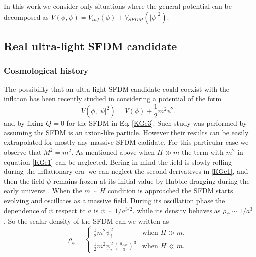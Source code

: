 \documentclass[amssymb,twocolumn,prd,nofootinbib,showpacs]{revtex4-1}
\begin{document}
In this work we consider only situations where the general potential can be 
decomposed as $V(\phi,\psi)=V_{inf}(\phi)+V_{SFDM}(|\psi|^2)$.

\subsection{Real ultra-light SFDM candidate}

\subsubsection{Cosmological history} %
The  possibility  that  an  ultra-light  SFDM  candidate could  coexist  with  the  inflaton  
has  been  recently  studied in \cite{SFrev2} considering a potential of the form
\begin{equation}\label{potential_massive}
V(\phi,|\psi|^2)=V(\phi)+\frac{1}{2}m^2\psi^2.
\end{equation}
%
and by fixing $Q=0$ for the SFDM in Eq. \eqref{KGe3}. Such study was performed by 
assuming the SFDM is an axion-like particle. However their results can be easily extrapolated for mostly any massive SFDM cadidate. 
For this particular case we observe that  $M^2=m^2$. As mentioned above when $H\gg m$ the term with $m^2$ 
in equation \eqref{KGe1} can be neglected. Bering in mind the field is slowly rolling during the inflationary era, 
we can neglect the second derivatives in \eqref{KGe1}, and then the field $\psi$ remains frozen at its initial value by 
Hubble dragging during the early universe \cite{curvatonatractor}. 
%
When the $m\sim H$ condition is approached the SFDM starts evolving and oscillates as a massive field. 
During its oscillation phase the dependence of $\psi$ respect to $a$ is $\psi\sim 1/a^{3/2}$, while its density 
behaves as $\rho_{\psi}\sim 1/a^3$  \cite{SFphi41,SFphi42}. So the scalar density of the SFDM can we written as
\begin{equation}\label{rhosfdm}
\rho_\psi = \left\lbrace\begin{array}{ll}
\frac{1}{2}m^2\psi_i^2 & \text{when }H\gg m, \\
\frac{1}{2}m^2\psi_i^2\left(\frac{a_{osc}}{a}\right)^3 & \text{when }H\ll m.
\end{array}\right .
\end{equation}
\end{document}
